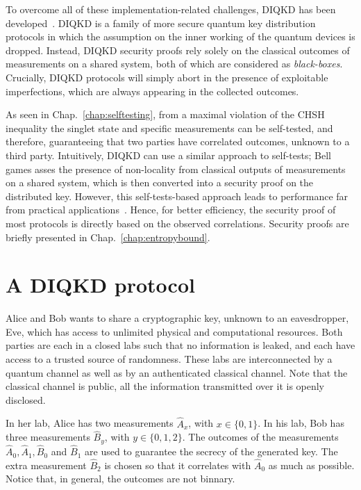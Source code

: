 \medbreak

To overcome all of these implementation-related challenges, \acrfull{DIQKD} has been developed~\cite{Acin2007,Vazirani2014,ArnonFriedman2018}.
\acrshort{DIQKD} is a family of more secure quantum key distribution protocols in which the assumption on the inner working of the quantum devices is dropped.
Instead, DIQKD security proofs rely solely on the classical outcomes of measurements on a shared system, both of which are considered as \textit{black-boxes}.
Crucially, DIQKD protocols will simply abort in the presence of exploitable imperfections, which are always appearing in the collected outcomes.


As seen in Chap.~\ref{chap:selftesting}, from a maximal violation of the CHSH inequality the singlet state and specific measurements can be self-tested, and therefore, guaranteeing that two parties have correlated outcomes, unknown to a third party.
Intuitively, DIQKD can use a similar approach to self-tests; Bell games asses the presence of non-locality from classical outputs of measurements on a shared system, which is then converted into a security proof on the distributed key.
However, this self-tests-based approach leads to performance far from practical applications~\cite{Fu2018,Kundu2022}.
Hence, for better efficiency, the security proof of most protocols is directly based on the observed correlations.
Security proofs are briefly presented in Chap.~\ref{chap:entropybound}.


\section{A DIQKD protocol}

Alice and Bob wants to share a cryptographic key, unknown to an eavesdropper, Eve, which has access to unlimited physical and computational resources.
Both parties are each in a closed labs such that no information is leaked, and each have access to a trusted source of randomness.
These labs are interconnected by a quantum channel as well as by an authenticated classical channel.
Note that the classical channel is public, all the information transmitted over it is openly disclosed.

In her lab, Alice has two measurements $\hat{A}_x$, with $x\in \{0,1\}$.
In his lab, Bob has three measurements $\hat{B}_y$, with $y \in \{0,1,2\}$.
The outcomes of the measurements $\hat{A}_0,\hat{A}_1,\hat{B}_0$ and $\hat{B}_1$ are used to guarantee the secrecy of the generated key.
The extra measurement $\hat{B}_2$ is chosen so that it correlates with $\hat{A}_0$ as much as possible.
Notice that, in general, the outcomes are not binnary.

